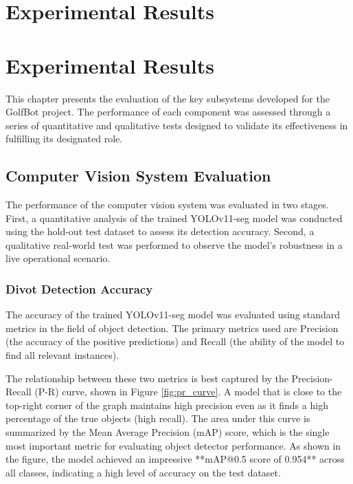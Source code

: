 \chapter{Experimental Results}
\label{chap:validation}

\chapter{Experimental Results}
\label{chap:validation}
This chapter presents the evaluation of the key subsystems developed for the GolfBot project. The performance of each component was assessed through a series of quantitative and qualitative tests designed to validate its effectiveness in fulfilling its designated role.

\section{Computer Vision System Evaluation}
\label{sec:cv_evaluation}
The performance of the computer vision system was evaluated in two stages. First, a quantitative analysis of the trained YOLOv11-seg model was conducted using the hold-out test dataset to assess its detection accuracy. Second, a qualitative real-world test was performed to observe the model's robustness in a live operational scenario.

\subsection{Divot Detection Accuracy}
\label{ssec:cv_accuracy}
The accuracy of the trained YOLOv11-seg model was evaluated using standard metrics in the field of object detection. The primary metrics used are Precision (the accuracy of the positive predictions) and Recall (the ability of the model to find all relevant instances).

The relationship between these two metrics is best captured by the Precision-Recall (P-R) curve, shown in Figure \ref{fig:pr_curve}. A model that is close to the top-right corner of the graph maintains high precision even as it finds a high percentage of the true objects (high recall). The area under this curve is summarized by the Mean Average Precision (mAP) score, which is the single most important metric for evaluating object detector performance. As shown in the figure, the model achieved an impressive **mAP@0.5 score of 0.954** across all classes, indicating a high level of accuracy on the test dataset.

